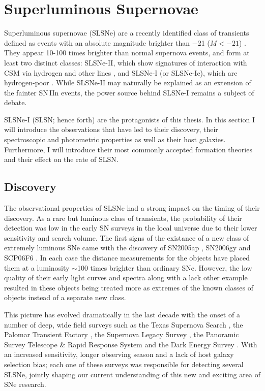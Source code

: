 \section{Superluminous Supernovae}
Superluminous supernovae (SLSNe) are a recently identified class of transients defined as events with an absolute magnitude brighter than $-$21 ($M<-21$) \citep{Gal-Yam2012}. They appear 10-100 times brighter than normal supernova events, and form at least two distinct classes: SLSNe-II, which show signatures of interaction with CSM via hydrogen and other lines \citep{2007ApJ...659L..13O,2007ApJ...666.1116S,2011ApJ...735..106D}, and SLSNe-I (or SLSNe-Ic), which are hydrogen-poor \citep{Quimby2011}. While SLSNe-II may naturally be explained as an extension of the fainter SN\,IIn events, the power source behind SLSNe-I remains a subject of debate.

SLSNe-I (SLSN; hence forth) are the protagonists of this thesis. In this section I will introduce the observations that have led to their discovery, their spectroscopic and photometric properties as well as their host galaxies. Furthermore, I will introduce their most commonly accepted formation theories and their effect on the rate of SLSN.

\subsection{Discovery}
The observational properties of SLSNe had a strong impact on the timing of their discovery. As a rare but luminous class of transients, the probability of their detection was low in the early SN surveys in the local universe due to their lower sensitivity and search volume. The first signs of the existance of a new class of extremely luminous SNe came with the discovery of SN2005ap \citep{Quimby2007}, SN2006gy \citep{Ofek2007} and SCP06F6 \citep{Barbary2009}. In each case the distance measurements for the objects have placed them at a luminosity $\sim$100 times brighter than ordinary SNe. However, the low quality of their early light curves and spectra along with a lack other example resulted in these objects being treated more as extremes of the known classes of objects instead of a separate new class.

This picture has evolved dramatically in the last decade with the onset of a number of deep, wide field surveys such as the Texas Supernova Search \citep[TSS;][]{2006PhDT........13Q}, the Palomar Transient Factory \citep[PTF;][]{2009PASP..121.1395L, 2009PASP..121.1334R}, the Supernova Legacy Survey \citep[SNLS;][]{2006A&amp;A...447...31A,2010A&amp;A...523A...7G,2010AJ....140..518P}, the Panoramic Survey Telescope \& Rapid Response System \citep[Pan-STARRS;][]{2010SPIE.7733E..0EK} and the Dark Energy Survey \citep[DES;][]{2005IJMPA..20.3121F}. With an increased sensitivity, longer observing season and a lack of host galaxy selection bias; each one of these surveys was responsible for detecting several SLSNe, jointly shaping our current understanding of this new and exciting area of SNe research.


